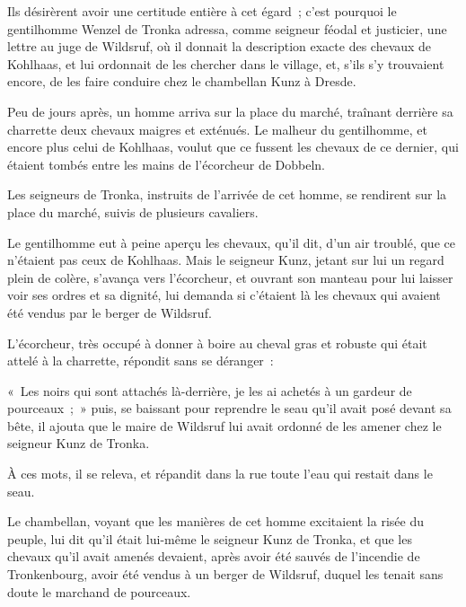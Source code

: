 \documentclass[french,twoside]{book} %
\begin{document}
Ils désirèrent avoir une certitude entière à cet égard ; c’est pourquoi le gentilhomme Wenzel de Tronka adressa, comme seigneur féodal et justicier, une lettre au juge de Wildsruf, où il donnait la description exacte des chevaux de Kohlhaas, et lui ordonnait de les chercher dans le village, et, s’ils s’y trouvaient encore, de les faire conduire chez le chambellan Kunz à Dresde.\par
Peu de jours après, un homme arriva sur la place du marché, traînant derrière sa charrette deux chevaux maigres et exténués. Le malheur du gentilhomme, et encore plus celui de Kohlhaas, voulut que ce fussent les chevaux de ce dernier, qui étaient tombés entre les mains de l’écorcheur de Dobbeln.\par
Les seigneurs de Tronka, instruits de l’arrivée de cet homme, se rendirent sur la place du marché, suivis de plusieurs cavaliers.\par
Le gentilhomme eut à peine aperçu les chevaux, qu’il dit, d’un air troublé, que ce n’étaient pas ceux de Kohlhaas. Mais le seigneur Kunz, jetant sur lui un regard plein de colère, s’avança vers l’écorcheur, et ouvrant son manteau pour lui laisser voir ses ordres et sa dignité, lui demanda si c’étaient là les chevaux qui avaient été vendus par le berger de Wildsruf.\par
L’écorcheur, très occupé à donner à boire au cheval gras et robuste qui était attelé à la charrette, répondit sans se déranger :\par
« Les noirs qui sont attachés là-derrière, je les ai achetés à un gardeur de pourceaux ; » puis, se baissant pour reprendre le seau qu’il avait posé devant sa bête, il ajouta que le maire de Wildsruf lui avait ordonné de les amener chez le seigneur Kunz de Tronka.\par
À ces mots, il se releva, et répandit dans la rue toute l’eau qui restait dans le seau.\par
Le chambellan, voyant que les manières de cet homme excitaient la risée du peuple, lui dit qu’il était lui-même le seigneur Kunz de Tronka, et que les chevaux qu’il avait amenés devaient, après avoir été sauvés de l’incendie de Tronkenbourg, avoir été vendus à un berger de Wildsruf, duquel les tenait sans doute le marchand de pourceaux.\par
\end{document}
